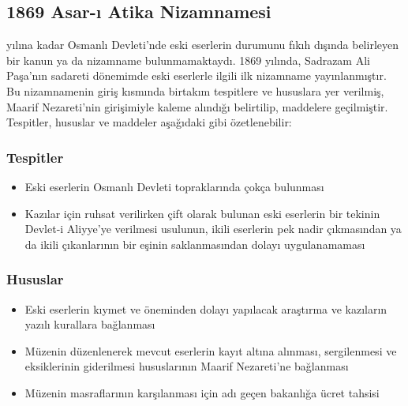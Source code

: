 \subsection{1869 Asar-ı Atika Nizamnamesi}
\indent{} yılına kadar Osmanlı Devleti'nde eski eserlerin durumunu fıkıh dışında belirleyen bir kanun ya da nizamname bulunmamaktaydı. 1869 yılında, Sadrazam Ali Paşa'nın sadareti dönemimde eski eserlerle ilgili ilk nizamname yayınlanmıştır. Bu nizamnamenin giriş kısmında birtakım tespitlere ve hususlara yer verilmiş, Maarif Nezareti'nin girişimiyle kaleme alındığı belirtilip, maddelere geçilmiştir. Tespitler, hususlar ve maddeler aşağıdaki gibi özetlenebilir:\cite{karaduman}
\subsubsection{Tespitler}
\begin{itemize}
    \item Eski eserlerin Osmanlı Devleti topraklarında çokça bulunması
    \item Kazılar için ruhsat verilirken çift olarak bulunan eski eserlerin bir tekinin Devlet-i Aliyye'ye verilmesi usulunun, ikili eserlerin pek nadir çıkmasından ya da ikili çıkanlarının bir eşinin saklanmasından dolayı uygulanamaması
\end{itemize}
\subsubsection{Hususlar}
\begin{itemize}
    \item Eski eserlerin kıymet ve öneminden dolayı yapılacak araştırma ve kazıların yazılı kurallara bağlanması
    \item Müzenin düzenlenerek mevcut eserlerin kayıt altına alınması, sergilenmesi ve eksiklerinin giderilmesi hususlarının Maarif Nezareti'ne bağlanması
    \item Müzenin masraflarının karşılanması için adı geçen bakanlığa ücret tahsisi
\end{itemize}
